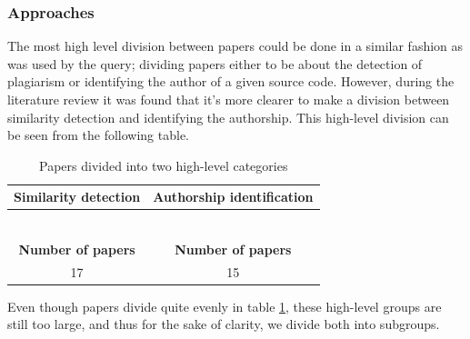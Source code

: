 \subsubsection{Approaches}

The most high level division between papers could be done in a similar fashion as was used by the
query; dividing papers either to be about the detection of plagiarism or identifying the author of a given source code. However, during the literature review it was found that it's more clearer to make a division between similarity detection and identifying the authorship. This high-level division can be seen from the following table.

\begin{table}[ht]
    \caption{Papers divided into two high-level categories}
    \label{table-highcateq}
    \centering
    \begin{tabular}{ | c | c | }
        
        \hline
        {\bf Similarity detection} & {\bf Authorship identification} \\ \hline
    
        \cite{AFAPLI2015, LICD2010, AASCPD2012} & \cite{SCAANN2017, ABEC2014, CAPSCAP2014}   \\
        \cite{Heblikar2015NormalizationBS, USCR2014, AIR2015} &  \cite{SCANG2007, EJPFSAI2004, ACSBPD2012}\\
        \cite{OTIOLSS2015, BUAA2009, ramirez2015high} &  \cite{APASCAI2007, UCMHGAAI2007, ESHPFSCAC2008}\\
        \cite{Ohmann2015, TBCFPD2012, Fu2017WASTKAW} &  \cite{AIRTSCAA2009, TSUDIJSCAI2011, DNNSCAI2013} \\
        \cite{ASTMLPD2013, AAPSCDPTK2013, CPDPPD2013}    & \cite{SCAIUFL2013, SDNAIJSP2015, AISC2017} \\
        \cite{PACASCD2005, RCISCP2017} &  \\ \hline
        {\bf Number of papers} & {\bf Number of papers} \\ \hline
        17 & 15 \\ \hline
    \end{tabular}
\end{table}

\noindent
Even though papers divide quite evenly in table \ref{table-highcateq}, these high-level groups are still too large, and thus for the sake of clarity, we divide both into subgroups.

